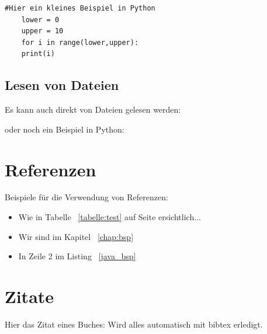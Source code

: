 \begin{lstlisting}[style=Python, caption={Python-Beispiel}, captionpos=b]
	#Hier ein kleines Beispiel in Python
	lower = 0
	upper = 10
	for i in range(lower,upper):
	print(i)
\end{lstlisting} 


\subsection{Lesen von Dateien}

Es kann auch direkt von Dateien gelesen werden:



oder noch ein Beispiel in Python:


\section{Referenzen}

Beispiele für die Verwendung von Referenzen: 

\begin{itemize}
	\item Wie in Tabelle ~\ref{tabelle:test} auf Seite \pageref{tabelle:test} ersichtlich... 
	\item Wir sind im Kapitel ~\ref{chap:bsp}
	\item In Zeile 2 im Listing ~\ref{java_bsp} 
\end{itemize}


\section{Zitate}


Hier das Zitat eines Buches: \cite{couper2001} Wird alles automatisch mit  bibtex erledigt.